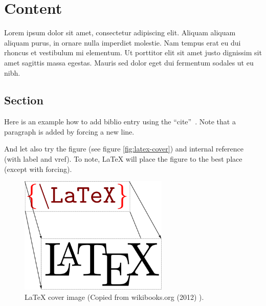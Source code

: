 \documentclass[11pt,a4paper,oneside]{memoir}
\begin{document}



\setcounter{page}{1} %


\chapter{Content}
Lorem ipsum dolor sit amet, consectetur adipiscing elit. Aliquam aliquam aliquam purus, in ornare nulla imperdiet molestie. Nam tempus erat eu dui rhoncus et vestibulum mi elementum. Ut porttitor elit sit amet justo dignissim sit amet sagittis massa egestas. Mauris sed dolor eget dui fermentum sodales ut eu nibh. 

\section{Section}
Here is an example how to add biblio entry \cite{kopka:guide} using the \textquotedblleft cite\textquotedblright ~\cite[section 4.2]{tobias:book}. Note that a paragraph is added by forcing a new line.

And let also try the figure (see figure \vref{fig:latex-cover}) and internal reference (with label and vref). To note, \LaTeX{} will place the figure to the best place (except with forcing).
\begin{figure}[h]
   \centering
   \includegraphics[width=7.1cm]{LaTeX_cover}
   \caption{\LaTeX{} cover image (Copied from wikibooks.org (2012) \cite{wikibooks:latex}).}
   \label{fig:latex-cover}
\end{figure}
\end{document}
